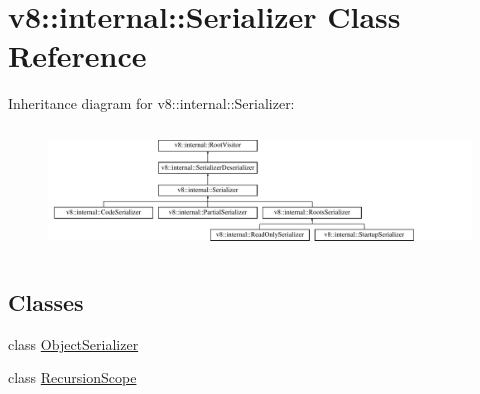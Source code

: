 \hypertarget{classv8_1_1internal_1_1Serializer}{}\section{v8\+:\+:internal\+:\+:Serializer Class Reference}
\label{classv8_1_1internal_1_1Serializer}
Inheritance diagram for v8\+:\+:internal\+:\+:Serializer\+:\begin{figure}[H]
\begin{center}
\leavevmode
\includegraphics[height=3.333333cm]{classv8_1_1internal_1_1Serializer}
\end{center}
\end{figure}
\subsection*{Classes}
\begin{DoxyCompactItemize}
\item 
class \mbox{\hyperlink{classv8_1_1internal_1_1Serializer_1_1ObjectSerializer}{Object\+Serializer}}
\item 
class \mbox{\hyperlink{classv8_1_1internal_1_1Serializer_1_1RecursionScope}{Recursion\+Scope}}
\end{DoxyCompactItemize}
